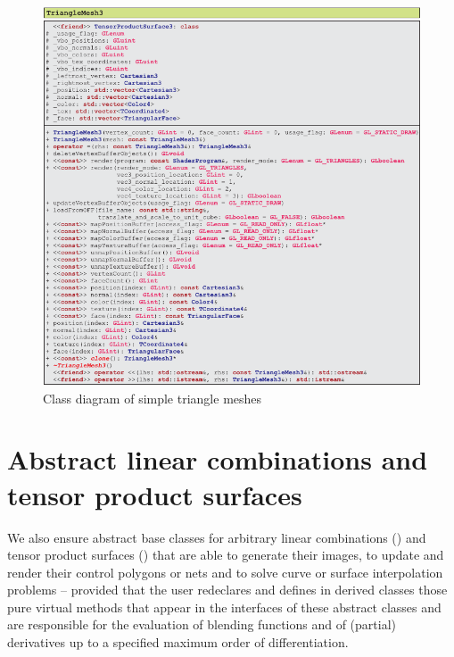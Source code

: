 \documentclass[b5paper, twosided]{book}
\newcommand{\CBlue}[1]{{\color[rgb]{0.0, 0.0, 0.9}{#1}}}
\begin{document}
\begin{figure}[!h]
    \centering
    \includegraphics[]{images/UMLTriangleMesh3+.pdf}
    \caption{Class diagram of simple triangle meshes}
    \label{fig:UMLTriangleMesh3}
\end{figure}







\section[Abstract linear combinations and tensor product surfaces]{Abstract linear combinations and tensor product surfaces}

We also ensure abstract base classes for arbitrary linear combinations (\CBlue{LinearCombination3}) and tensor product surfaces (\CBlue{TensorProductSurface3}) that are able to generate their images, to update and render their control polygons or nets and to solve curve or surface interpolation problems -- provided that the user redeclares and defines in derived classes those pure virtual methods that appear in the interfaces of these abstract classes and are responsible for the evaluation of blending functions and of (partial) derivatives up to a specified maximum order of differentiation. 
\end{document}
